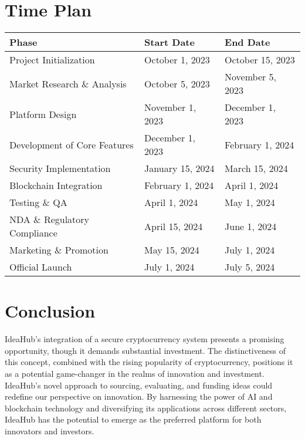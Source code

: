 \documentclass{article}
\begin{document}
	\section{Time Plan}
	\begin{tabularx}{\textwidth}{|X|X|X|}
		\hline
		\textbf{Phase} & \textbf{Start Date} & \textbf{End Date} \\
		\hline
		Project Initialization & October 1, 2023 & October 15, 2023 \\
		\hline
		Market Research \& Analysis & October 5, 2023 & November 5, 2023 \\
		\hline
		Platform Design & November 1, 2023 & December 1, 2023 \\
		\hline
		Development of Core Features & December 1, 2023 & February 1, 2024 \\
		\hline
		Security Implementation & January 15, 2024 & March 15, 2024 \\
		\hline
		Blockchain Integration & February 1, 2024 & April 1, 2024 \\
		\hline
		Testing \& QA & April 1, 2024 & May 1, 2024 \\
		\hline
		NDA \& Regulatory Compliance & April 15, 2024 & June 1, 2024 \\
		\hline
		Marketing \& Promotion & May 15, 2024 & July 1, 2024 \\
		\hline
		Official Launch & July 1, 2024 & July 5, 2024 \\
		\hline
	\end{tabularx}
	
	\section{Conclusion}
	IdeaHub's integration of a secure cryptocurrency system presents a promising opportunity, though it demands substantial investment. The distinctiveness of this concept, combined with the rising popularity of cryptocurrency, positions it as a potential game-changer in the realms of innovation and investment. IdeaHub's novel approach to sourcing, evaluating, and funding ideas could redefine our perspective on innovation. By harnessing the power of AI and blockchain technology and diversifying its applications across different sectors, IdeaHub has the potential to emerge as the preferred platform for both innovators and investors.
	
\end{document}
